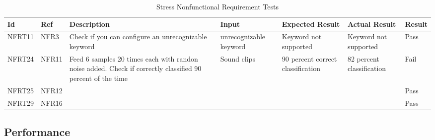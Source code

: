 \documentclass[12pt, titlepage]{article}
\begin{document}
\begin{longtable}{|p{1.4cm}|p{1.4cm}|p{3cm}|p{1.5cm}|p{2.5cm}|p{2cm}|p{1.2cm}|}
  \caption{Stress Nonfunctional Requirement Tests}
  \label{stressNonfunctionalRequirementTests}
  \endfirsthead
  \endhead
  \hline
  \textbf{Id} & \textbf{Ref} & \textbf{Description}                                                         & \textbf{Input}                                    & \textbf{Expected Result}    & \textbf{Actual Result}                          & \textbf{Result}                                     \\ \hline
  NFRT11        & NFR3          & Check if you can configure an unrecognizable keyword              & unrecognizable keyword                          & Keyword not supported                      & Keyword not supported                         & {\color[HTML]{32CB00} Pass}                         \\ \hline
  NFRT24        & NFR11         & Feed 6 samples 20 times each with randon noise added. Check if correctly classified 90 percent of the time           & Sound clips   & 90 percent correct classification        & 82 percent classification     & {\color[HTML]{FE0000} Fail}                           \\ \hline
  NFRT25        & NFR12         &         &   &                   &                     & {\color[HTML]{32CB00} Pass}                         \\ \hline
  NFRT29        & NFR16         & &  & &         & {\color[HTML]{32CB00} Pass}                         \\ \hline
\end{longtable}

\subsection{Performance}
\end{document}
